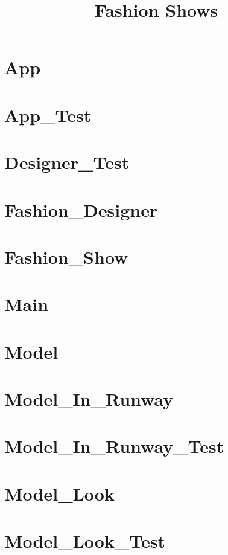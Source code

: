 \documentclass{article}
\begin{document}
\title{Fashion Shows}
\author{}
\maketitle
\tableofcontents

\section{App}

\section{App\_Test}

\section{Designer\_Test}

\section{Fashion\_Designer}

\section{Fashion\_Show}

\section{Main}

\section{Model}

\section{Model\_In\_Runway}

\section{Model\_In\_Runway\_Test}

\section{Model\_Look}

\section{Model\_Look\_Test}

\end{document}
